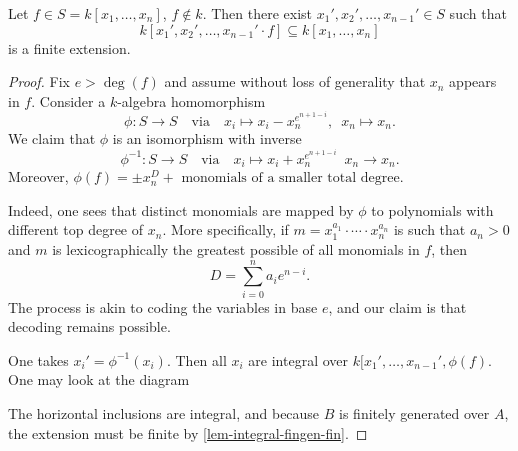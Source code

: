 \begin{lemma}
  Let $f \in S = k[x_1, \dotsc, x_n]$, $f \notin k$. Then there exist $x_1', x_2', \dotsc, x_{n-1}' \in S$ such that
  \[k[x_1', x_2', \dotsc, x_{n-1}' \cdot f] \subseteq k[x_1, \dotsc, x_n]\]
  is a finite extension.
\end{lemma}
\begin{proof}
  Fix $e > \deg(f)$ and assume without loss of generality that $x_n$ appears in $f$. Consider a $k$-algebra homomorphism
  \[ \phi \colon S \to S \quad \text{via} \quad x_i \mapsto x_i - x_n^{e^{n+1-i}}, \enspace x_n \mapsto x_n.\]
  We claim that $\phi$ is an isomorphism with inverse
  \[ \phi^{-1} \colon S \to S \quad \text{via} \quad x_i \mapsto x_i + x_n^{e^{n+1-i}} \enspace x_n \to x_n.\]
  Moreover, $\phi(f) = \pm x_n^D + \text{ monomials of a smaller total degree}$.

  Indeed, one sees that distinct monomials are mapped by $\phi$ to polynomials with different top degree of $x_n$. More specifically, if $m = x_1^{a_1} \cdot \dotsb \cdot x_n^{a_n}$ is such that $a_n > 0$ and $m$ is lexicographically the greatest possible of all monomials in $f$, then
  \[ D = \sum_{i=0}^n a_i e^{n-i}.\]
  The process is akin to coding the variables in base $e$, and our claim is that decoding remains possible.

  One takes $x_i' = \phi^{-1}(x_i)$. Then all $x_i$ are integral over $k[x_1', \dotsc, x_{n-1}', \phi(f)$. One may look at the diagram
  The horizontal inclusions are integral, and because $B$ is finitely generated over $A$, the extension must be finite by \cref{lem-integral-fingen-fin}.
\end{proof}

